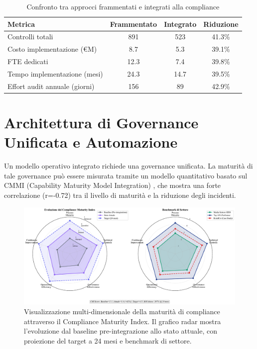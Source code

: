\begin{table}[h]
\centering
\caption{Confronto tra approcci frammentati e integrati alla compliance}
\label{tab:confronto_compliance}
\begin{tabular}{|l|c|c|c|}
\hline
\textbf{Metrica} & \textbf{Frammentato} & \textbf{Integrato} & \textbf{Riduzione} \\
\hline
Controlli totali & 891 & 523 & 41.3\% \\
Costo implementazione (€M) & 8.7 & 5.3 & 39.1\% \\
FTE dedicati & 12.3 & 7.4 & 39.8\% \\
Tempo implementazione (mesi) & 24.3 & 14.7 & 39.5\% \\
Effort audit annuale (giorni) & 156 & 89 & 42.9\% \\
\hline
\end{tabular}
\end{table}



\section{Architettura di Governance Unificata e Automazione}

Un modello operativo integrato richiede una governance unificata. La maturità di tale governance può essere misurata tramite un modello quantitativo basato sul CMMI (Capability Maturity Model Integration) \autocite{CMMI2023}, che mostra una forte correlazione (r=-0.72) tra il livello di maturità e la riduzione degli incidenti.

\begin{figure}[htbp]
\centering
\includegraphics[width=\textwidth]{thesis_figures/cap4/figura_4_2_cmi_radar.pdf}
\caption{Visualizzazione multi-dimensionale della maturità di compliance attraverso il Compliance Maturity Index. Il grafico radar mostra l'evoluzione dal baseline pre-integrazione allo stato attuale, con proiezione del target a 24 mesi e benchmark di settore.}
\label{fig:cmi_radar}
\end{figure}

